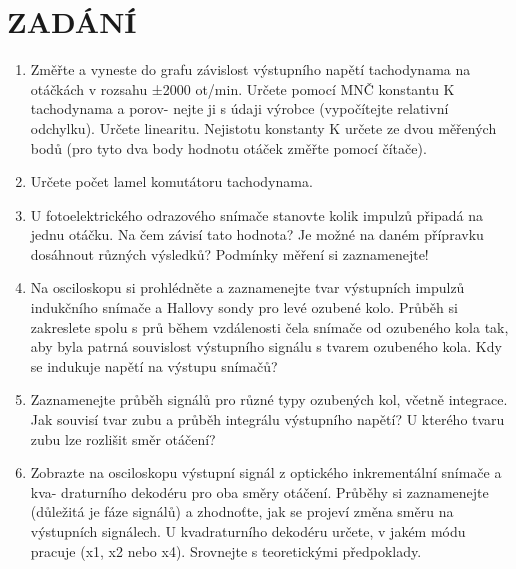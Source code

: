\documentclass{protokol}
\begin{document}
\maketitle                  %

\section{ZADÁNÍ}\label{kap:zadani}
    \begin{enumerate}
        \item   Změřte a vyneste do grafu závislost výstupního napětí tachodynama na otáčkách
                v rozsahu ±2000 ot/min. Určete pomocí MNČ konstantu K tachodynama a porov-
                nejte ji s údaji výrobce (vypočítejte relativní odchylku). Určete linearitu. Nejistotu
                konstanty K určete ze dvou měřených bodů (pro tyto dva body hodnotu otáček
                změřte pomocí čítače).

        \item   Určete počet lamel komutátoru tachodynama.
                
        \item   U fotoelektrického odrazového snímače stanovte kolik impulzů připadá na jednu
                otáčku. Na čem závisí tato hodnota? Je možné na daném přípravku dosáhnout
                různých výsledků? Podmínky měření si zaznamenejte!
        
        \item   Na osciloskopu si prohlédněte a zaznamenejte tvar výstupních impulzů indukčního
                snímače a Hallovy sondy pro levé ozubené kolo. Průběh si zakreslete spolu s prů
                během vzdálenosti čela snímače od ozubeného kola tak, aby byla patrná souvislost
                výstupního signálu s tvarem ozubeného kola. Kdy se indukuje napětí na výstupu
                snímačů?

        \item   Zaznamenejte průběh signálů pro různé typy ozubených kol, včetně integrace. Jak
                souvisí tvar zubu a průběh integrálu výstupního napětí? U kterého tvaru zubu lze
                rozlišit směr otáčení?

        \item   Zobrazte na osciloskopu výstupní signál z optického inkrementální snímače a kva-
                draturního dekodéru pro oba směry otáčení. Průběhy si zaznamenejte (důležitá je
                fáze signálů) a zhodnoťte, jak se projeví změna směru na výstupních signálech. U
                kvadraturního dekodéru určete, v jakém módu pracuje (x1, x2 nebo x4). Srovnejte
                s teoretickými předpoklady.
                

\end{enumerate}
\end{document}
